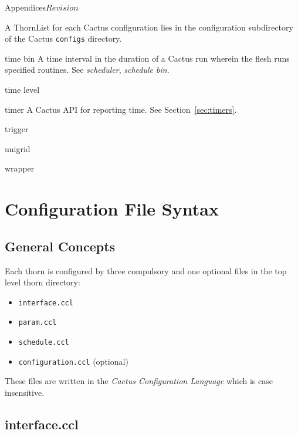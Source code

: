 \begin{cactuspart}{Appendices}{}{$Revision$}
\begin{Lentry}
  A ThornList for each Cactus configuration lies in the configuration
  subdirectory of the Cactus {\tt configs} directory.
\item[time bin]
  A time interval in the duration of a Cactus run wherein the flesh 
  runs specified routines.  See \textit{scheduler}, \textit{schedule bin}.
\item[time level]
\item[timer]
  A Cactus API for reporting time.  See Section~\ref{sec:timers}.
\item[trigger]
\item[unigrid]
\item[wrapper]

\end{Lentry}


\chapter{Configuration File Syntax}
\label{sec:Appendix.ccl}

\section{General Concepts}

Each thorn is configured by three compulsory and one optional files in the
top level thorn directory:
\begin{itemize}
\item{} {\tt interface.ccl}
\item{} {\tt param.ccl}
\item{} {\tt schedule.ccl}
\item{} {\tt configuration.ccl} (optional)
\end{itemize}
These files are written in the \textit{Cactus Configuration Language} which is
case insensitive.


\section{interface.ccl}
\label{sec:Appendix.interface}


\end{cactuspart}
